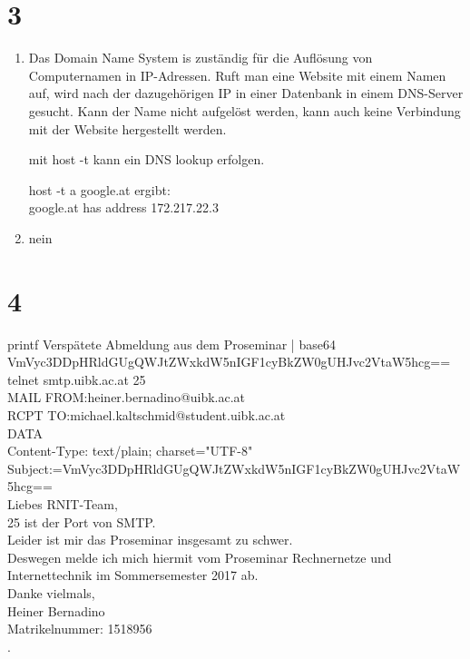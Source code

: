 \documentclass[ngerman]{scrartcl}
\begin{document}
\section*{3}
	\begin{enumerate}[label=\alph*)]
	\item 
	  Das Domain Name System is zuständig für die Auflösung von Computernamen in IP-Adressen.
	  Ruft man eine Website mit einem Namen auf, wird nach der dazugehörigen IP in einer Datenbank 
	  in einem DNS-Server gesucht. Kann der Name nicht aufgelöst werden, kann auch keine Verbindung 
	  mit der Website hergestellt werden.
	  
	  mit host -t kann ein DNS lookup erfolgen.
	  
	  host -t a google.at ergibt: \\
	  google.at has address 172.217.22.3
	 \item 
	  nein
	  
	\end{enumerate}
\pagebreak	  
\section*{4}
	 printf Verspätete Abmeldung aus dem Proseminar | base64 \\
	 VmVyc3DDpHRldGUgQWJtZWxkdW5nIGF1cyBkZW0gUHJvc2VtaW5hcg== \\
	 
	 telnet smtp.uibk.ac.at 25 \\
	 
	 MAIL FROM:heiner.bernadino@uibk.ac.at \\
	 RCPT TO:michael.kaltschmid@student.uibk.ac.at \\
	 DATA \\
	 Content-Type: text/plain; charset="UTF-8" \\
	 Subject:=VmVyc3DDpHRldGUgQWJtZWxkdW5nIGF1cyBkZW0gUHJvc2VtaW5hcg== \\
	 Liebes RNIT-Team, \\
	 25 ist der Port von SMTP. \\
	 Leider ist mir das Proseminar insgesamt zu schwer. \\
	 Deswegen melde ich mich hiermit vom Proseminar Rechnernetze und \\
	 Internettechnik im Sommersemester 2017 ab. \\
	 Danke vielmals, \\
	 Heiner Bernadino \\
	 Matrikelnummer: 1518956 \\ 
	 .	  
\end{document}
